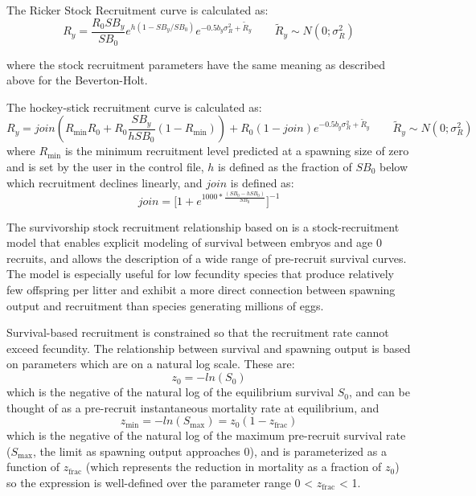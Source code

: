 \hypertarget{Ricker}{}
The Ricker Stock Recruitment curve is calculated as:
\begin{equation}{R_y = \frac{R_0SB_y}{SB_0}e^{h(1-SB_y/SB_0)}e^{-0.5b_y\sigma^2_R+\tilde{R}_y}\qquad  \tilde{R}_y\sim N(0;\sigma^2_R)}
\end{equation}

where the stock recruitment parameters have the same meaning as described above for the Beverton-Holt.

\hypertarget{Hockey}{}
The hockey-stick recruitment curve is calculated as:
\begin{equation}{R_y = join(R_{\text{min}}R_0+R_0\frac{SB_y}{hSB_0}(1-R_{\text{min}}))+R_0(1-join)e^{-0.5b_y\sigma^2_R+\tilde{R}_y}\qquad  \tilde{R}_y\sim N(0;\sigma^2_R)}\end{equation}
where $R_{\text{min}}$ is the minimum recruitment level predicted at a spawning size of zero and is set by the user in the control file, $h$ is defined as the fraction of $SB_0$ below which recruitment declines linearly, and $join$ is defined as:
\begin{equation}{ join = \bigg[1+e^{1000*\frac{(SB_0-hSB_0)}{SB_0}}\bigg]^{-1} } \end{equation}

\hypertarget{Survivorship}{}
The survivorship stock recruitment relationship based on \citet{taylor-stockrecruitment-2013} is a stock-recruitment model that enables explicit modeling of survival between embryos and age 0 recruits, and allows the description of a wide range of pre-recruit survival curves. The model is especially useful for low fecundity species that produce relatively few offspring per litter and exhibit a more direct connection between spawning output and recruitment than species generating millions of eggs.

Survival-based recruitment is constrained so that the recruitment rate cannot exceed fecundity. The relationship between survival and spawning output is based on parameters which are on a natural log scale. These are:
\begin{equation}
z_0=-ln(S_0)
\end{equation} 
which is the negative of the natural log of the equilibrium survival $S_0$, and can be thought of as a pre-recruit instantaneous mortality rate at equilibrium, and
\begin{equation}
z_{\text{min}}=-ln(S_{\text{max}})=z_0(1-z_{\text{frac}})
\end{equation}
which is the negative of the natural log of the maximum pre-recruit survival rate ($S_{\text{max}}$, the limit as spawning output approaches 0), and is parameterized as a function of $z_{\text{frac}}$ (which represents the reduction in mortality as a fraction of $z_0$) so the expression is well-defined over the parameter range 0 < $z_{\text{frac}}$ < 1.

